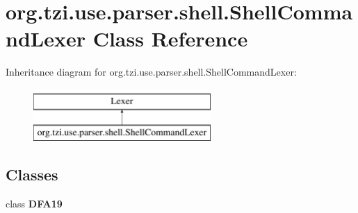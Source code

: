 \hypertarget{classorg_1_1tzi_1_1use_1_1parser_1_1shell_1_1_shell_command_lexer}{\section{org.\-tzi.\-use.\-parser.\-shell.\-Shell\-Command\-Lexer Class Reference}
\label{classorg_1_1tzi_1_1use_1_1parser_1_1shell_1_1_shell_command_lexer}
}
Inheritance diagram for org.\-tzi.\-use.\-parser.\-shell.\-Shell\-Command\-Lexer\-:\begin{figure}[H]
\begin{center}
\leavevmode
\includegraphics[height=2.000000cm]{classorg_1_1tzi_1_1use_1_1parser_1_1shell_1_1_shell_command_lexer}
\end{center}
\end{figure}
\subsection*{Classes}
\begin{DoxyCompactItemize}
\item 
class {\bfseries D\-F\-A19}
\end{DoxyCompactItemize}

